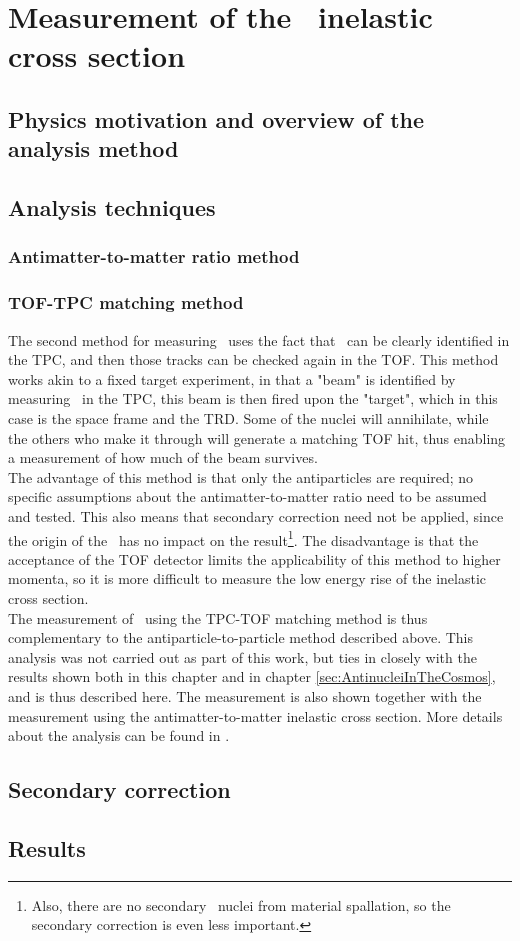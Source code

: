\section{Measurement of the \ahe\ inelastic cross section}\label{sec:ResHe3SigmaInel}
\subsection{Physics motivation and overview of the analysis method}
\subsection{Analysis techniques}
\subsubsection{Antimatter-to-matter ratio method}

\subsubsection{TOF-TPC matching method}
The second method for measuring \sigmainel\ uses the fact that \ahe\ can be clearly identified in the TPC, and then those tracks can be checked again in the TOF. This method works akin to a fixed target experiment, in that a "beam" is identified by measuring \ahe\ in the TPC, this beam is then fired upon the "target", which in this case is the space frame and the TRD. Some of the nuclei will annihilate, while the others who make it through will generate a matching TOF hit, thus enabling a measurement of how much of the beam survives. \\
The advantage of this method is that only the antiparticles are required; no specific assumptions about the antimatter-to-matter ratio need to be assumed and tested. This also means that secondary correction need not be applied, since the origin of the \ahe\ has no impact on the result\footnote{Also, there are no secondary \ahe\ nuclei from material spallation, so the secondary correction is even less important.}. The disadvantage is that the acceptance of the TOF detector limits the applicability of this method to higher momenta, so it is more difficult to measure the low energy rise of the inelastic cross section. \\

The measurement of \sigmainel\ using the TPC-TOF matching method is thus complementary to the antiparticle-to-particle method described above. This analysis was not carried out as part of this work, but ties in closely with the results shown both in this chapter and in chapter \ref{sec:AntinucleiInTheCosmos}, and is thus described here. The measurement is also shown together with the measurement using the antimatter-to-matter inelastic cross section. More details about the analysis can be found in \cite{PavelAN, antiHe3XS}.

\subsection{Secondary correction}
\subsection{Results}

